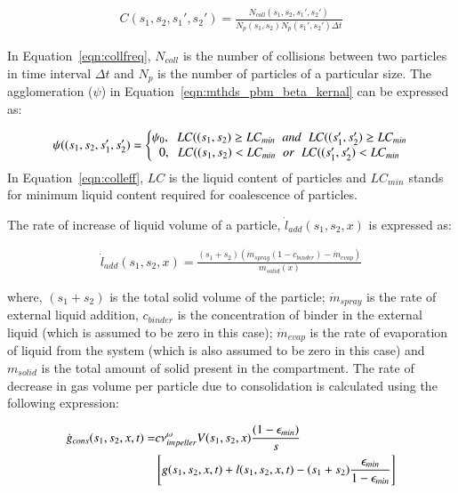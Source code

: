\documentclass[preprint,11pt,authoryear]{elsarticle}
\begin{document}
\begin{align}
C(s_1,s_2,s_1',s_2')=\frac{N_{coll}(s_1,s_2,s_1',s_2')}{N_p(s_1,s_2)N_p(s_1',s_2')\Delta t}
\label{eqn:collfreq}
\end{align}

In Equation~\ref{eqn:collfreq}, $N_{coll}$ is the number of collisions between two particles in 
time interval $\Delta t$ and $N_p$ is the number of particles of a particular size. The agglomeration 
($\psi$) in Equation~\ref{eqn:mthds_pbm_beta_kernal} can be expressed as:

\begin{align}
\psi((s_1,s_2,s_1',s_2') = 
\left\{\begin{matrix}
\psi_0,\hspace{0.2cm} LC((s_1,s_2) \geq LC_{min}\hspace{0.2cm} and\hspace{0.2cm} LC((s_1',s_2') \geq LC_{min}	\\ 
0,\hspace{0.2cm} LC((s_1,s_2) < LC_{min}\hspace{0.2cm} or\hspace{0.2cm} LC((s_1',s_2') < LC_{min}
\end{matrix}\right.
\label{eqn:colleff}
\end{align}
 In Equation~\ref{eqn:colleff}, $LC$ is the liquid content of particles and $LC_{min}$ stands for minimum 
 liquid content required for coalescence of particles. 

The rate of increase of liquid volume of a particle, $\dot{l}_{add}(s_1,s_2,x)$ is expressed as:

\begin{align}
\dot{l}_{add}(s_1,s_2,x) = \frac{(s_1+s_2)(\dot{m}_{spray}(1-c_{binder})-\dot{m}_{evap})}{m_{solid}(x)}
\end{align}

where, $(s_1+s_2)$  is the total solid volume of the particle; $\dot{m}_{spray}$ is the rate of external 
liquid addition, $c_{binder}$ is the concentration of binder in the external liquid (which is assumed to 
be zero in this case); $\dot{m}_{evap}$ is the rate of evaporation of liquid from 
the system (which is also assumed to be zero in this case) and $m_{solid}$ is the total amount of solid 
present in the compartment.
The rate of decrease in gas volume per particle due to consolidation is calculated using the 
following expression:~\citep{Verkoeijen2002} 

\begin{align}
\dot{g}_{cons}(s_1,s_2,x,t)=& c \nu_{impeller}^{\omega}V(s_1,s_2,x)\frac{(1-\epsilon_{min})}{s} 
\notag \\ 
& \left[g(s_1,s_2,x,t)+l(s_1,s_2,x,t) -(s_1+s_2)\frac{\epsilon_{min}}{1-\epsilon_{min}}\right]
\end{align}        
\end{document}
